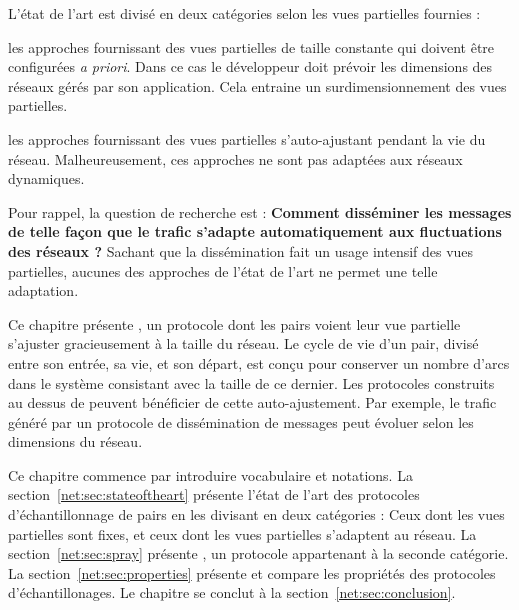 
L'état de l'art est divisé en deux catégories selon les vues partielles fournies :
\begin{inparaenum}
\item les approches fournissant des vues partielles de taille constante qui
  doivent être configurées \emph{a priori}. Dans ce cas le développeur doit
  prévoir les dimensions des réseaux gérés par son application. Cela entraine un
  surdimensionnement des vues partielles.
\item les approches fournissant des vues partielles s'auto-ajustant pendant la
  vie du réseau. Malheureusement, ces approches ne sont pas adaptées aux réseaux
  dynamiques.
\end{inparaenum}

Pour rappel, la question de recherche est : \textbf{Comment disséminer les
  messages de telle façon que le trafic s’adapte automatiquement aux
  fluctuations des réseaux ?}  Sachant que la dissémination fait un usage
intensif des vues partielles, aucunes des approches de l'état de l'art ne permet
une telle adaptation.

Ce chapitre présente \SPRAY, un protocole dont les pairs voient leur vue
partielle s'ajuster gracieusement à la taille du réseau. Le cycle de vie d'un
pair, divisé entre son entrée, sa vie, et son départ, est conçu pour conserver
un nombre d'arcs dans le système consistant avec la taille de ce dernier. Les
protocoles construits au dessus de \SPRAY peuvent bénéficier de cette
auto-ajustement. Par exemple, le trafic généré par un protocole de dissémination
de messages peut évoluer selon les dimensions du réseau.

Ce chapitre commence par introduire vocabulaire et notations. La
section~\ref{net:sec:stateoftheart} présente l'état de l'art des protocoles
d'échantillonnage de pairs en les divisant en deux catégories : Ceux dont les
vues partielles sont fixes, et ceux dont les vues partielles s'adaptent au
réseau. La section~\ref{net:sec:spray} présente \SPRAY, un protocole appartenant
à la seconde catégorie. La section~\ref{net:sec:properties} présente et compare
les propriétés des protocoles d'échantillonages. Le chapitre se conclut à la
section~\ref{net:sec:conclusion}.

